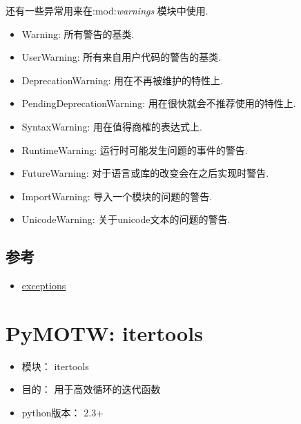 \documentclass[a4paper,10pt,english]{manual}
\begin{document}
还有一些异常用来在:mod:\emph{warnings} 模块中使用.
\begin{itemize}
\item {} 
Warning: 所有警告的基类.

\item {} 
UserWarning: 所有来自用户代码的警告的基类.

\item {} 
DeprecationWarning: 用在不再被维护的特性上.

\item {} 
PendingDeprecationWarning: 用在很快就会不推荐使用的特性上.

\item {} 
SyntaxWarning: 用在值得商榷的表达式上.

\item {} 
RuntimeWarning: 运行时可能发生问题的事件的警告.

\item {} 
FutureWarning: 对于语言或库的改变会在之后实现时警告.

\item {} 
ImportWarning: 导入一个模块的问题的警告.

\item {} 
UnicodeWarning: 关于unicode文本的问题的警告.

\end{itemize}


\section{参考}
\begin{itemize}
\item {} 
\href{http://docs.python.org/library/exceptions.html}{exceptions}

\end{itemize}

\resetcurrentobjects


\chapter{PyMOTW: itertools}
\begin{itemize}
\item {} 
模块： itertools

\item {} 
目的： 用于高效循环的迭代函数

\item {} 
python版本： 2.3+

\end{itemize}
\end{document}
